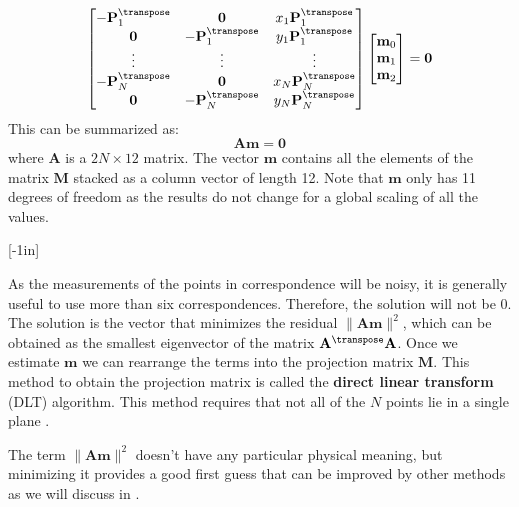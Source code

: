 \begin{equation}
    \begin{bmatrix}
    -\mathbf{P}_1^\transpose & \mathbf{0} & x_1 \mathbf{P}_1^\transpose\\
    \mathbf{0} & -\mathbf{P}_1^\transpose & y_1 \mathbf{P}_1^\transpose\\
    \vdots & \vdots & \vdots \\
    -\mathbf{P}_N^\transpose & \mathbf{0} & x_N \mathbf{P}_N^\transpose\\
    \mathbf{0} & -\mathbf{P}_N^\transpose & y_N \mathbf{P}_N^\transpose
    \end{bmatrix}
    \begin{bmatrix}
    \mathbf{m}_0 \\
    \mathbf{m}_1 \\
    \mathbf{m}_2
    \end{bmatrix}
    = 
    \mathbf{0}
\end{equation}
This can be summarized as:
\begin{equation}
\mathbf{A} \mathbf{m} = \mathbf{0}
\end{equation}
where $\mathbf{A}$ is a $2N \times 12$ matrix. The vector $\mathbf{m}$ contains all the elements of the matrix $\mathbf{M}$ stacked as a column vector of length 12. Note that $\mathbf{m}$ only has 11 degrees of freedom as the results do not change for a global scaling of all the values. 

[-1in]

As the measurements of the points in correspondence will be noisy, it is generally useful to use more than six correspondences. Therefore, the solution will not be 0. 
The solution is the vector that minimizes the residual $\|\mathbf{A} \mathbf{m} \|^2$, which can be obtained as the smallest eigenvector of the matrix $\mathbf{A}^\transpose \mathbf{A}$. Once we estimate  $\mathbf{m}$ we can rearrange the terms into the projection matrix $\mathbf{M}$. This method to obtain the projection matrix is called the {\bf direct linear transform} (DLT) algorithm. 
This method requires that not all of the $N$ points lie in a single plane \cite{Hartley2004}.

The term $\|\mathbf{A} \mathbf{m} \|^2$ doesn't have any particular physical meaning, but minimizing it provides a good first guess that can be improved by other methods as we will discuss in \sect{\ref{sec:cam_cal_minimizing_reprojection_error}}.

